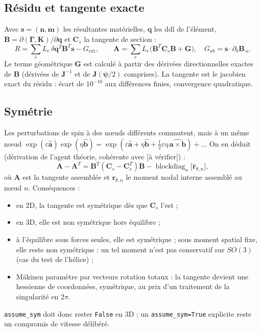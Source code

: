 \documentclass[11pt,a4paper]{article}
\newcommand{\hatv}[1]{\widehat{\bm{#1}}}
\newcommand{\Gam}{\bm{\Gamma}}
\newcommand{\Kv}{\mathbf{K}}
\newcommand{\code}[1]{\texttt{#1}}
\newcommand{\averif}{\textcolor{orange!80!black}{[à vérifier]}}
\begin{document}
\subsection{Résidu et tangente exacte}
Avec $\mathbf s=(\mathbf n,\mathbf m)$ les résultantes matérielles,
$\mathbf q$ les ddl de l'élément, $\mathbf B=\partial(\Gam,\Kv)/\partial\mathbf q$
et $\mathbf C_s$ la tangente de section :
\begin{equation}
R=\sum_eL_e\,\delta\mathbf q^T\mathbf B^T\mathbf s-G_{\text{ext}},\qquad
\mathbf A=\sum_eL_e\big(\mathbf B^T\mathbf C_s\mathbf B+\mathbf G\big),\quad
G_{ab}=\mathbf s\cdot\partial_b\mathbf B_{\cdot a}.
\end{equation}
Le terme géométrique $\mathbf G$ est calculé à partir des dérivées
directionnelles exactes de $\mathbf B$ (dérivées de $\mathbf J^{-1}$ et de
$\mathbf J(\bm\psi/2)$ comprises). La tangente est le jacobien exact du résidu :
écart de $10^{-10}$ aux différences finies, convergence quadratique.

\subsection{Symétrie}
Les perturbations de spin à des nœuds différents commutent, mais à un même nœud
$\exp(\varepsilon\hatv a)\exp(\eta\hatv b)=\exp(\varepsilon\hatv a+\eta\hatv b+\tfrac12\varepsilon\eta\,\widehat{\mathbf a\times\mathbf b})+\dots$
On en déduit (dérivation de l'agent théorie, cohérente avec
\cite{simovuquoc1986,simo1992hessian} \averif) :
\begin{equation}
\mathbf A-\mathbf A^T=\mathbf B^T(\mathbf C_s-\mathbf C_s^T)\mathbf B-\operatorname{blockdiag}_n\big[\hatv r_{\theta,n}\big],
\end{equation}
où $\mathbf A$ est la tangente assemblée et $\mathbf r_{\theta,n}$ le moment
nodal interne assemblé au nœud $n$. Conséquences :
\begin{itemize}
\item en 2D, la tangente est symétrique dès que $\mathbf C_s$ l'est ;
\item en 3D, elle est non symétrique hors équilibre ;
\item à l'équilibre sous forces seules, elle est symétrique ; sous moment
spatial fixe, elle reste non symétrique : un tel moment n'est pas conservatif
sur $SO(3)$ \cite{argyris1982} (cas du test de l'hélice) ;
\item Mäkinen \cite{makinen2007} paramètre par vecteurs rotation totaux : la
tangente devient une hessienne de coordonnées, symétrique, au prix d'un
traitement de la singularité en $2\pi$.
\end{itemize}
\code{assume\_sym} doit donc rester \code{False} en 3D ; un \code{assume\_sym=True}
explicite reste un compromis de vitesse délibéré.
\end{document}
